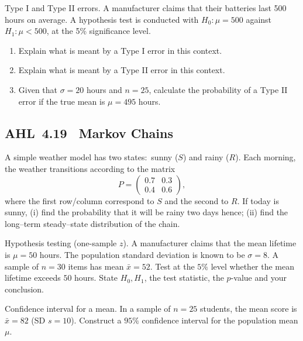 \documentclass[11pt]{article}
\def\textbf#1{#1}%
\newcommand{\tocsubsection}[1]{\subsection{#1}}
\newcounter{question}
\begin{document}
\begin{question}
\textbf{Type I and Type II errors.}
A manufacturer claims that their batteries last 500 hours on average. A hypothesis test is conducted with $H_0\!:\mu=500$ against $H_1\!:\mu<500$, at the 5\% significance level.
\begin{enumerate}
    \item Explain what is meant by a Type I error in this context.
    \item Explain what is meant by a Type II error in this context.
    \item Given that $\sigma=20$ hours and $n=25$, calculate the probability of a Type II error if the true mean is $\mu=495$ hours.
\end{enumerate}
\end{question}



\tocsubsection{AHL 4.19 \; Markov Chains}

\begin{question}
A simple weather model has two states:\ sunny ($S$) and rainy ($R$).  Each
morning, the weather transitions according to the matrix
\[P=\begin{pmatrix}0.7 & 0.3\\0.4 & 0.6\end{pmatrix},\]
where the first row/column correspond to $S$ and the second to $R$.
If today is sunny, (i) find the probability that it will be rainy two days
hence; (ii) find the long–term steady–state distribution of the chain.
\end{question}






\begin{question}
\textbf{Hypothesis testing (one-sample $z$).}\;
A manufacturer claims that the mean lifetime is $\mu=50$ hours. The population standard deviation is known to be $\sigma=8$.
A sample of $n=30$ items has mean $\bar x=52$. Test at the $5\%$ level whether the mean lifetime exceeds $50$ hours.
State $H_0,H_1$, the test statistic, the $p$-value and your conclusion.
\end{question}

\begin{question}
\textbf{Confidence interval for a mean.}\;
In a sample of $n=25$ students, the mean score is $\bar x=82$ (SD $s=10$).
Construct a $95\%$ confidence interval for the population mean $\mu$.
\end{question}
\end{document}
